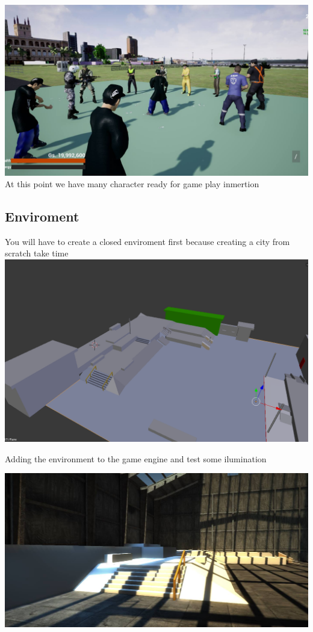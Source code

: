 \documentclass{article}
\begin{document}
  \includegraphics[width=\textwidth]{81.jpg}
  At this point we have many character ready for game play inmertion

  \subsection{Enviroment}
  You will have to create a closed enviroment first because creating a city from scratch take time 
  \includegraphics[width=\textwidth]{25.png}
  
  Adding the environment to the game engine and test some ilumination

  \includegraphics[width=\textwidth]{26.jpg}
  
\end{document}
